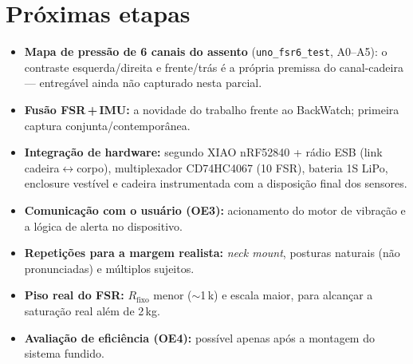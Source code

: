 \documentclass[12pt,a4paper]{article}
\begin{document}
\section{Próximas etapas}
\label{sec:proximas}
\begin{itemize}[nosep]
  \item \textbf{Mapa de pressão de 6 canais do assento} (\texttt{uno\_fsr6\_test},
        A0--A5): o contraste esquerda/direita e frente/trás é a própria premissa do
        canal-cadeira --- entregável ainda não capturado nesta parcial.
  \item \textbf{Fusão FSR\,+\,IMU:} a novidade do trabalho frente ao BackWatch;
        primeira captura conjunta/contemporânea.
  \item \textbf{Integração de hardware:} segundo XIAO nRF52840 + rádio ESB
        (link cadeira{$\leftrightarrow$}corpo), multiplexador CD74HC4067 (10 FSR),
        bateria 1S LiPo, enclosure vestível e cadeira instrumentada com a
        disposição final dos sensores.
  \item \textbf{Comunicação com o usuário (OE3):} acionamento do motor de vibração
        e a lógica de alerta no dispositivo.
  \item \textbf{Repetições para a margem realista:} \emph{neck mount}, posturas
        naturais (não pronunciadas) e múltiplos sujeitos.
  \item \textbf{Piso real do FSR:} $R_{\text{fixo}}$ menor ($\sim$1\,k\ohm) e escala
        maior, para alcançar a saturação real além de 2\,kg.
  \item \textbf{Avaliação de eficiência (OE4):} possível apenas após a montagem do
        sistema fundido.
\end{itemize}

\end{document}
